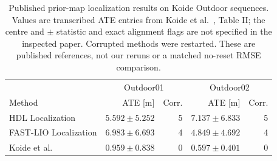 \begin{table}[t]
\centering
\caption{Published prior-map localization results on Koide Outdoor sequences. Values are transcribed ATE entries from Koide et al.~\cite{Koide2024RangeInertial}, Table II; the centre and $\pm$ statistic and exact alignment flags are not specified in the inspected paper. Corrupted methods were restarted. These are published references, not our reruns or a matched no-reset RMSE comparison.}
\label{tab:published-classic}
\begin{tabular}{lrrrr}
\hline
&\multicolumn{2}{c}{Outdoor01}&\multicolumn{2}{c}{Outdoor02}\\
Method & ATE [m] & Corr. & ATE [m] & Corr.\\
\hline
HDL Localization & $5.592\pm5.252$ &5&$7.137\pm6.833$&5\\
FAST-LIO Localization & $6.983\pm6.693$ &4&$4.849\pm4.692$&4\\
Koide et al. & $0.959\pm0.838$ &0&$0.597\pm0.401$&0\\
\hline
\end{tabular}
\end{table}
